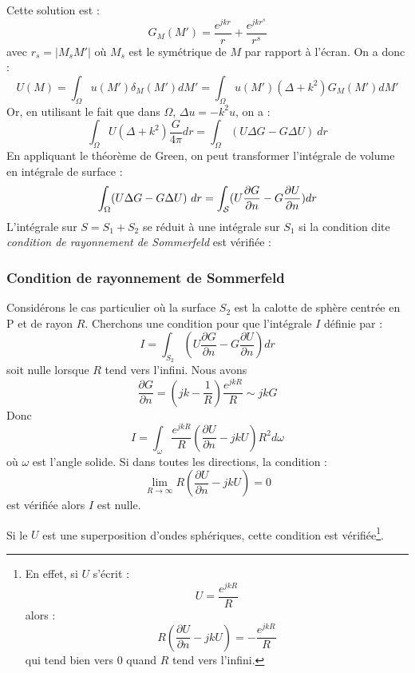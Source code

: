 \documentclass[12pt]{book}
\begin{document}
Cette solution est :
\begin{equation}\label{eqgreendif}
G_M(M')=\frac{e^{jkr}}{r}+\frac{e^{jkr^s}}{r^s}
\end{equation}
avec $r_s=|M_sM'|$ o\`u $M_s$ est le sym\'etrique de $M$ par rapport
\`a l'\'ecran.
On a donc :
\begin{equation}
U(M)=\int_\Omega u(M')\delta_M(M') dM'=\int_\Omega
u(M')(\Delta+k^2)G_M(M')dM' 
\end{equation}
Or, en utilisant le fait que dans $\Omega$, $\Delta u=-k^2u$, on a :
\begin{equation}
\int_{\Omega}U(\Delta+k^2)\frac{G}{4\pi}dr=\int_{\Omega}(U\Delta
G-G\Delta U)\ dr
\end{equation}
En appliquant le th\'eor\`eme de Green, on peut
transformer l'int\'egrale de volume en int\'egrale de surface :
\begin{equation}
\int_{\Omega}(U\Delta G-G\Delta U)\ dr=\int_{\cal S}(U\frac{\partial
 G}{\partial n}-G\frac{\partial U}{\partial n}) dr
\end{equation}
L'int\'egrale sur $S=S_1+S_2$ se r\'eduit \`a une int\'egrale sur
$S_1$  si la 
condition dite {\it condition de rayonnement de
Sommerfeld} est
v\'erifi\'ee :
\subsubsection{Condition de rayonnement de Sommerfeld}
Consid\'erons le cas particulier o\`u la surface $S_2$ est la calotte de
sph\`ere centr\'ee en P et de rayon $R$. Cherchons une condition pour que
l'int\'egrale $I$ d\'efinie par :
\begin{equation}
I=\int_{S_2}(U\frac{\partial G}{\partial n}-G\frac{\partial
U}{\partial n}) dr
\end{equation}
soit nulle lorsque $R$ tend vers l'infini.
Nous avons
\begin{equation}
\frac{\partial G}{\partial n}=(jk-\frac{1}{R})\frac{e^{jkR}}{R}\sim jkG
\end{equation}
Donc
\begin{equation}
I=\int_{\omega}\frac{e^{jkR}}{R}(\frac{\partial U}{\partial n}-jkU)R^2
d\omega
\end{equation}
o\`u $\omega$ est l'angle solide.
Si dans toutes les directions, la condition : 
\begin{equation}
\lim_{R\rightarrow\infty}R(\frac{\partial U}{\partial n}-jkU)=0
\end{equation}
est v\'erifi\'ee alors $I$ est nulle.
\begin{rem}
Si le $U$ est une superposition d'ondes sph\'eriques, cette condition est
v\'erifi\'ee\footnote{%
En effet, si $U$ s'\'ecrit :
\begin{equation}
U=\frac{e^{jkR}}{R}
\end{equation}
alors :
\begin{equation}
R(\frac{\partial U}{\partial n}-jkU)=-\frac{e^{jkR}}{R}
\end{equation}
 qui tend bien vers 0 quand $R$ tend vers l'infini.
}.
\end{rem}
\end{document}
